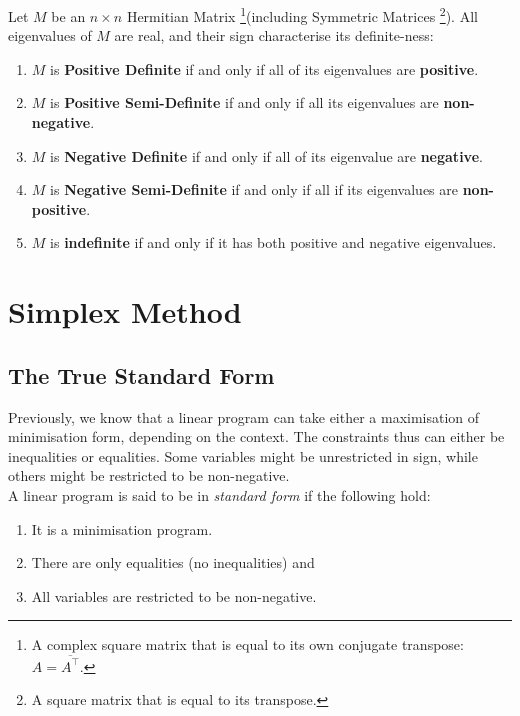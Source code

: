 \documentclass{article}
\begin{document}
\begin{definition}

    Let $M$ be an $n \times n$ Hermitian Matrix \footnote{A complex square matrix that is equal to its own conjugate transpose: $A = \overline{A^{\top}}.$}(including Symmetric Matrices \footnote{A square matrix that is equal to its transpose.}). All eigenvalues of $M$ are real, and their sign characterise its definite-ness:

    \begin{enumerate}
        \item $M$ is \textbf{Positive Definite} if and only if all of its eigenvalues are \textbf{positive}.
        \item $M$ is \textbf{Positive Semi-Definite} if and only if all its eigenvalues are \textbf{non-negative}. 
        \item $M$ is \textbf{Negative Definite} if and only if all of its eigenvalue are \textbf{negative}.
        \item $M$ is \textbf{Negative Semi-Definite} if and only if all if its eigenvalues are \textbf{non-positive}. 
        \item $M$ is \textbf{indefinite} if and only if it has both positive and negative eigenvalues.
    \end{enumerate}

\end{definition}


\section{Simplex Method}

\subsection{The True Standard Form}
Previously, we know that a linear program can take either a maximisation of minimisation form, depending on the context. The constraints thus can either be inequalities or equalities. Some variables might be unrestricted in sign, while others might be restricted to be non-negative. \\ 

\noindent A linear program is said to be in \textit{standard form} if the following hold: 

\begin{enumerate}
    \item It is a minimisation program.
    \item There are only equalities (no inequalities) and 
    \item All variables are restricted to be non-negative. 
\end{enumerate}
\end{document}
